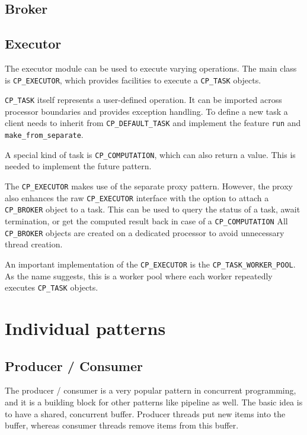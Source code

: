 \documentclass[a4paper,10pt]{report}
\begin{document}
\subsection{Broker}

\todo{}

\subsection{Executor}

The executor module can be used to execute varying operations.
The main class is \lstinline!CP_EXECUTOR!, which provides facilities to execute a \lstinline!CP_TASK! objects.

\lstinline!CP_TASK! itself represents a user-defined operation.
It can be imported across processor boundaries and provides exception handling.
To define a new task a client needs to inherit from \lstinline!CP_DEFAULT_TASK! and implement the feature \lstinline!run! and \lstinline!make_from_separate!.

A special kind of task is \lstinline!CP_COMPUTATION!, which can also return a value.
This is needed to implement the future pattern.

The \lstinline!CP_EXECUTOR! makes use of the separate proxy pattern.
However, the proxy also enhances the raw \lstinline!CP_EXECUTOR! interface with the option to attach a \lstinline!CP_BROKER! object to a task.
This can be used to query the status of a task, await termination, or get the computed result back in case of a \lstinline!CP_COMPUTATION!
All \lstinline!CP_BROKER! objects are created on a dedicated processor to avoid unnecessary thread creation.

An important implementation of the \lstinline!CP_EXECUTOR! is the \lstinline!CP_TASK_WORKER_POOL!.
As the name suggests, this is a worker pool where each worker repeatedly executes \lstinline!CP_TASK! objects.

\section {Individual patterns}

\subsection{Producer / Consumer}

The producer / consumer is a very popular pattern in concurrent programming, and it is a building block for other patterns like pipeline as well.
The basic idea is to have a shared, concurrent buffer.
Producer threads put new items into the buffer, whereas consumer threads remove items from this buffer.
\end{document}
